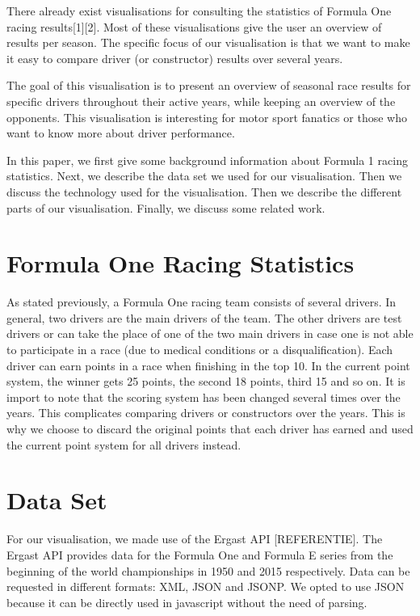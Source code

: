 \documentclass{sigchi}
\begin{document}
There already exist visualisations for consulting the statistics of Formula One racing results[1][2]. Most of these visualisations give the user an overview of results per season. The specific focus of our visualisation is that we want to make it easy to compare driver (or constructor) results over several years.
 
The goal of this visualisation is to present an overview of seasonal race results for specific drivers throughout their active years, while keeping an overview of the opponents. This visualisation is interesting for motor sport fanatics or those who want to know more about driver performance.
 
In this paper, we first give some background information about Formula 1 racing statistics. Next, we describe the data set we used for our visualisation. Then we discuss the technology used for the visualisation. Then we describe the different parts of our visualisation. Finally, we discuss some related work. 



\section{Formula One Racing Statistics}

As stated previously, a Formula One racing team consists of several drivers. In general, two drivers are the main drivers of the team. The other drivers are test drivers or can take the place of one of the two main drivers in case one is not able to participate in a race (due to medical conditions or a disqualification). Each driver can earn points in a race when finishing in the top 10. In the current point system, the winner gets 25 points, the second 18 points, third 15 and so on. It is import to note that the scoring system has been changed several times over the years. This complicates comparing drivers or constructors over the years. This is why we choose to discard the original points that each driver has earned and used the current point system for all drivers instead.


\section{Data Set}
For our visualisation, we made use of the Ergast API [REFERENTIE]. The Ergast API provides data for the Formula One and Formula E series from the beginning of the world championships in 1950 and 2015 respectively. Data can be requested in different formats: XML, JSON and JSONP. We opted to use JSON because it can be directly used in javascript without the need of parsing. 
\end{document}
